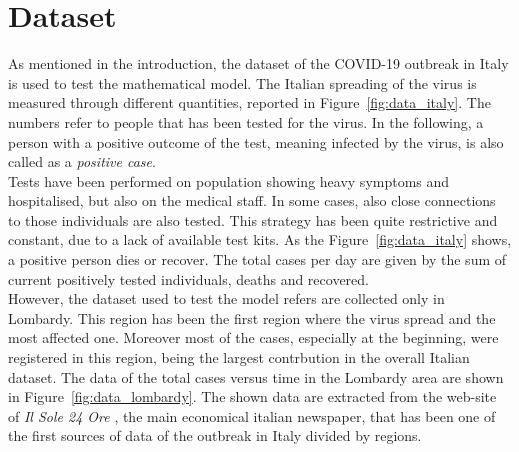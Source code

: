 \section{Dataset}
\label{sec:data}

As mentioned in the introduction, the dataset of the COVID-19 outbreak in Italy is used to test the mathematical model. The Italian spreading of the virus is measured through different quantities, reported in Figure~\ref{fig:data_italy}. The numbers refer to people that has been tested for the virus. In the following, a person with a positive outcome of the test, meaning infected by the virus, is also called as a \emph{positive case}.  \\

Tests have been performed on population showing heavy symptoms and hospitalised, but also on the medical staff. In some cases, also close connections to those individuals are also tested. This strategy has been quite restrictive and constant, due to a lack of available test kits. As the Figure~\ref{fig:data_italy} shows, a positive person dies or recover. The total cases per day are given by the sum of current positively tested individuals, deaths and recovered.\\

However, the dataset used to test the model refers are collected only in Lombardy. This region has been the first region where the virus spread and the most affected one. Moreover most of the cases, especially at the beginning, were registered in this region, being the largest contrbution in the overall Italian dataset. The data of the total cases versus time in the Lombardy area are shown in Figure~\ref{fig:data_lombardy}. The shown data are extracted from the web-site of \emph{Il Sole 24 Ore} \cite{Lab24}, the main economical italian newspaper, that has been one of the first sources of data of the outbreak in Italy divided by regions. \\


